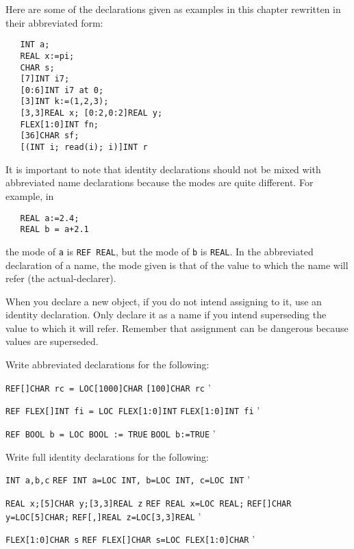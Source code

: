 Here are some of the declarations given as examples in this chapter
rewritten in their abbreviated form:
\begin{verbatim}
   INT a;
   REAL x:=pi;
   CHAR s;
   [7]INT i7;
   [0:6]INT i7 at 0;
   [3]INT k:=(1,2,3);
   [3,3]REAL x; [0:2,0:2]REAL y;
   FLEX[1:0]INT fn;
   [36]CHAR sf;
   [(INT i; read(i); i)]INT r
\end{verbatim}
\noindent
It is important to note that identity declarations should not be
mixed with abbreviated name declarations because the modes are quite
different. For example, in
\begin{verbatim}
   REAL a:=2.4;
   REAL b = a+2.1
\end{verbatim}
\noindent
the mode of \verb|a| is \verb|REF REAL|, but the mode of \verb|b| is
\verb|REAL|. In the abbreviated declaration of a name, the mode given
is that of the value to which the name will refer (the
actual-declarer).

When you declare a new object, if you do not intend assigning to it,
use an identity declaration. Only declare it as a name if you intend
superseding the value to which it will refer. Remember that assignment
can be dangerous because values are superseded.

\begin{exercise}
\item Write abbreviated declarations for the following:\newline
\begin{subex}
\item \verb|REF[]CHAR rc = LOC[1000]CHAR|
\subans \verb|[100]CHAR rc|
'
\item \verb|REF FLEX[]INT fi = LOC FLEX[1:0]INT|
\subans \verb|FLEX[1:0]INT fi|
'
\item \verb|REF BOOL b = LOC BOOL := TRUE|
\subans \verb|BOOL b:=TRUE| 
'
\end{subex}
\item Write full identity declarations for the following:\newline
\begin{subex}
\item \verb|INT a,b,c|
\subans \verb|REF INT a=LOC INT, b=LOC INT, c=LOC INT|
'
\item \verb|REAL x;[5]CHAR y;[3,3]REAL z|
\subans \verb|REF REAL x=LOC REAL;|\newline
\verb|REF[]CHAR y=LOC[5]CHAR;|\newline
\verb|REF[,]REAL z=LOC[3,3]REAL|
'
\item \verb|FLEX[1:0]CHAR s|
\subans \verb|REF FLEX[]CHAR s=LOC FLEX[1:0]CHAR|
'
\end{subex}
\end{exercise}

